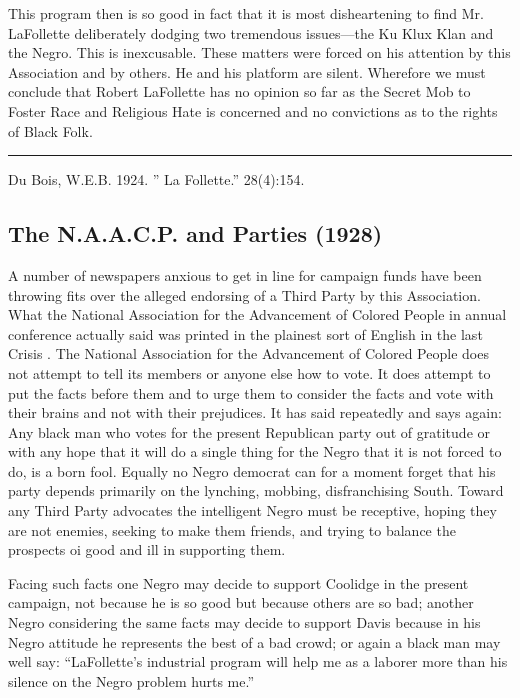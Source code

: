 \documentclass[letterpaper,10pt,english]{jupyterBook}
\begin{document}
\sphinxAtStartPar
This program then is so good in fact that it is most disheartening to find Mr. LaFollette deliberately dodging two tremendous issues—the Ku Klux Klan and the Negro. This is inexcusable. These matters were forced on his attention by this Association and by others. He and his platform are silent. Wherefore we must conclude that Robert LaFollette has no opinion so far as the Secret Mob to Foster Race and Religious Hate is concerned and no convictions as to the rights of Black Folk.


\bigskip\hrule\bigskip


\sphinxAtStartPar
{} Du Bois, W.E.B. 1924. ” La Follette.” 28(4):154.


\subsection{The N.A.A.C.P. and Parties (1928)}
\label{\detokenize{Volumes/28/05/naacp_and_parties:the-n-a-a-c-p-and-parties-1928}}\label{\detokenize{Volumes/28/05/naacp_and_parties::doc}}
\sphinxAtStartPar
A number of newspapers anxious to get in line for campaign funds have been throwing fits over the alleged endorsing of a Third Party by this Association. What the National Association for the Advancement of Colored People in annual conference actually said was printed in the plainest sort of English in the last Crisis . The National Association for the Advancement of Colored People does not attempt to tell its members or anyone else how to vote. It does attempt to put the facts before them and to urge them to consider the facts and vote with their brains and not with their prejudices. It has said repeatedly and says again: Any black man who votes for the present Republican party out of gratitude or with any hope that it will do a single thing for the Negro that it is not forced to do, is a born fool. Equally no Negro democrat can for a moment forget that his party depends primarily on the lynching, mobbing, disfranchising South. Toward any Third Party advocates the intelligent Negro must be receptive, hoping they are not enemies, seeking to make them friends, and trying to balance the prospects oi good and ill in supporting them.

\sphinxAtStartPar
Facing such facts one Negro may decide to support Coolidge in the present campaign, not because he is so good but because others are so bad; another Negro considering the same facts may decide to support Davis because in his Negro attitude he represents the best of a bad crowd; or again a black man may well say: “LaFollette’s industrial program will help me as a laborer more than his silence on the Negro problem hurts me.”
\end{document}
